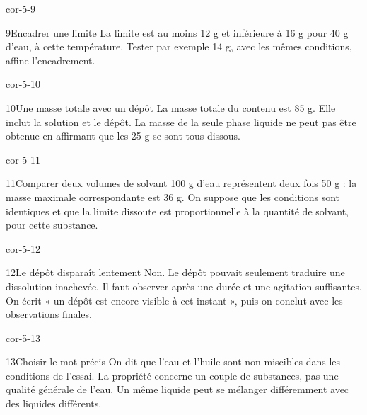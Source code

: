 \documentclass[12pt,twoside,openany]{book}
\begin{document}
\begin{blocLivre}{cor-5-9}
\begin{corrige}{9}{Encadrer une limite}
La limite est au moins 12 g et inférieure à 16 g pour 40 g d’eau, à cette température. Tester par exemple 14 g, avec les mêmes conditions, affine l’encadrement.\par
\end{corrige}\end{blocLivre}
\begin{blocLivre}{cor-5-10}
\begin{corrige}{10}{Une masse totale avec un dépôt}
La masse totale du contenu est 85 g. Elle inclut la solution et le dépôt. La masse de la seule phase liquide ne peut pas être obtenue en affirmant que les 25 g se sont tous dissous.\par
\end{corrige}\end{blocLivre}
\begin{blocLivre}{cor-5-11}
\begin{corrige}{11}{Comparer deux volumes de solvant}
100 g d’eau représentent deux fois 50 g : la masse maximale correspondante est 36 g. On suppose que les conditions sont identiques et que la limite dissoute est proportionnelle à la quantité de solvant, pour cette substance.\par
\end{corrige}\end{blocLivre}
\begin{blocLivre}{cor-5-12}
\begin{corrige}{12}{Le dépôt disparaît lentement}
Non. Le dépôt pouvait seulement traduire une dissolution inachevée. Il faut observer après une durée et une agitation suffisantes. On écrit « un dépôt est encore visible à cet instant », puis on conclut avec les observations finales.\par
\end{corrige}\end{blocLivre}
\begin{blocLivre}{cor-5-13}
\begin{corrige}{13}{Choisir le mot précis}
On dit que l’eau et l’huile sont non miscibles dans les conditions de l’essai. La propriété concerne un couple de substances, pas une qualité générale de l’eau. Un même liquide peut se mélanger différemment avec des liquides différents.\par
\end{corrige}\end{blocLivre}
\end{document}

